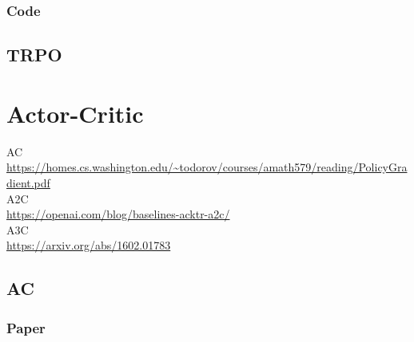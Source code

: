 \documentclass{book}
\begin{document}
\subsection{Code}
\section{TRPO}
\chapter{Actor-Critic} 
\noindent AC\\
\url{https://homes.cs.washington.edu/~todorov/courses/amath579/reading/PolicyGradient.pdf}\\
A2C\\
\url{https://openai.com/blog/baselines-acktr-a2c/}\\
A3C\\
\url{https://arxiv.org/abs/1602.01783}
\section{AC}
\subsection{Paper}
\end{document}
